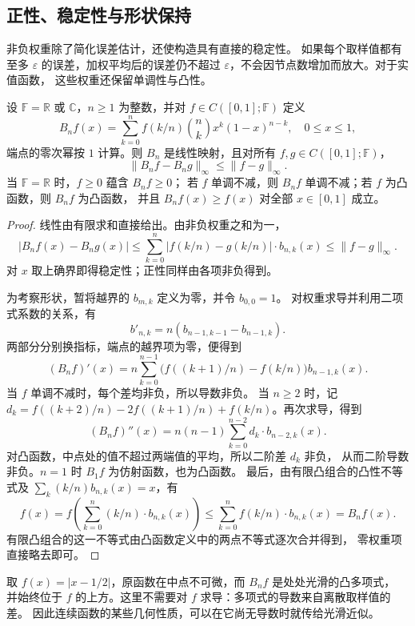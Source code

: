 \subsection{正性、稳定性与形状保持}
\label{b2:subsec:approximation-bernstein-shape}

非负权重除了简化误差估计，还使构造具有直接的稳定性。
如果每个取样值都有至多 \(\varepsilon\) 的误差，加权平均后的误差仍不超过
\(\varepsilon\)，不会因节点数增加而放大。对于实值函数，
这些权重还保留单调性与凸性。

\begin{proposition}
\label{b2:prop:approximation-bernstein-shape}
设 \(\mathbb F=\mathbb R\) 或 \(\mathbb C\)，\(n\geq1\) 为整数，并对
\(f\in C([0,1];\mathbb F)\) 定义
\[
 B_nf(x)=\sum_{k=0}^nf(k/n)\binom nk x^k(1-x)^{n-k},\quad 0\leq x\leq1,
\]
端点的零次幂按 \(1\) 计算。则 \(B_n\) 是线性映射，且对所有
\(f,g\in C([0,1];\mathbb F)\)，
\[
 \lVert B_nf-B_ng\rVert_\infty\leq\lVert f-g\rVert_\infty.
\]
当 \(\mathbb F=\mathbb R\) 时，\(f\geq0\) 蕴含 \(B_nf\geq0\)；
若 \(f\) 单调不减，则 \(B_nf\) 单调不减；若 \(f\) 为凸函数，则 \(B_nf\) 为凸函数，
并且 \(B_nf(x)\geq f(x)\) 对全部 \(x\in[0,1]\) 成立。
\end{proposition}
\begin{proof}
线性由有限求和直接给出。由非负权重之和为一，
\[
 |B_nf(x)-B_ng(x)|
 \leq\sum_{k=0}^n|f(k/n)-g(k/n)|\cdot b_{n,k}(x)
 \leq\lVert f-g\rVert_\infty.
\]
对 \(x\) 取上确界即得稳定性；正性同样由各项非负得到。

为考察形状，暂将越界的 \(b_{m,k}\) 定义为零，并令 \(b_{0,0}=1\)。
对权重求导并利用二项式系数的关系，有
\[
 b'_{n,k}=n(b_{n-1,k-1}-b_{n-1,k}).
\]
两部分分别换指标，端点的越界项为零，便得到
\[
 (B_nf)'(x)=n\sum_{k=0}^{n-1}
       \bigl(f((k+1)/n)-f(k/n)\bigr)b_{n-1,k}(x).
\]
当 \(f\) 单调不减时，每个差均非负，所以导数非负。
当 \(n\geq2\) 时，记
\(d_k=f((k+2)/n)-2f((k+1)/n)+f(k/n)\)。再次求导，得到
\[
 (B_nf)''(x)=n(n-1)\sum_{k=0}^{n-2}d_k\cdot b_{n-2,k}(x).
\]
对凸函数，中点处的值不超过两端值的平均，所以二阶差 \(d_k\) 非负，
从而二阶导数非负。\(n=1\) 时 \(B_1f\) 为仿射函数，也为凸函数。
最后，由有限凸组合的凸性不等式及 \(\sum_k(k/n)b_{n,k}(x)=x\)，有
\[
 f(x)=f\!\left(\sum_{k=0}^n(k/n)\cdot b_{n,k}(x)\right)
 \leq\sum_{k=0}^nf(k/n)\cdot b_{n,k}(x)=B_nf(x).
\]
有限凸组合的这一不等式由凸函数定义中的两点不等式逐次合并得到，
零权重项直接略去即可。
\end{proof}

取 \(f(x)=|x-1/2|\)，原函数在中点不可微，而 \(B_nf\) 是处处光滑的凸多项式，
并始终位于 \(f\) 的上方。这里不需要对 \(f\) 求导：多项式的导数来自离散取样值的差。
因此连续函数的某些几何性质，可以在它尚无导数时就传给光滑近似。

